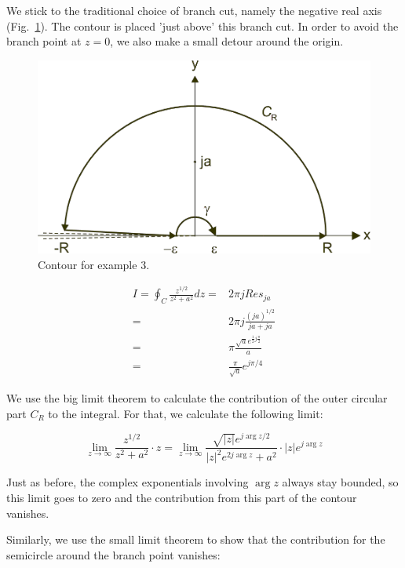 We stick to the traditional choice of branch cut, namely the negative real axis
(Fig.~\ref{fig-example-3}). The contour is placed 'just above' this branch cut. In order to avoid the branch point at $z=0$, we also make a small detour around the origin.

\begin{figure}
\centering
\includegraphics{complex/figures/int_ex_3}
\caption{Contour for example 3.}
\label{fig-example-3}
\end{figure}

\begin{align}
I = \oint_{{C}} \frac{z^{1/2}}{z^2+a^2} dz =& 2 \pi j Res_{j a}
\nonumber \\
=& 2 \pi j \frac{(j a)^{1/2}}{ja + ja} \nonumber \\
=& \pi \frac{\sqrt{a}e^{\frac{1}{2}j\frac{\pi}{2}}}{a} \nonumber \\
=& \frac{\pi}{\sqrt{a}} e^{j \pi /4}
\end{align}

We use the big limit theorem to calculate the contribution of the outer circular
part ${C_R}$ to the integral. For that, we calculate the following
limit:

\begin{equation}
\lim_{z \to \infty}\frac{z^{1/2}}{z^2+a^2} \cdot z = \lim_{z \to
\infty}\frac{\sqrt{|z|}e^{j \arg z / 2}}{|z|^2 e^{2 j \arg z}+a^2} \cdot |z|
e^{j \arg z}
\end{equation}

Just as before, the complex exponentials involving $\arg z$ always stay bounded,
so this limit goes to zero and the contribution from this part of the contour
vanishes.

Similarly, we use the small limit theorem to show that the contribution for the
semicircle around the branch point vanishes:

